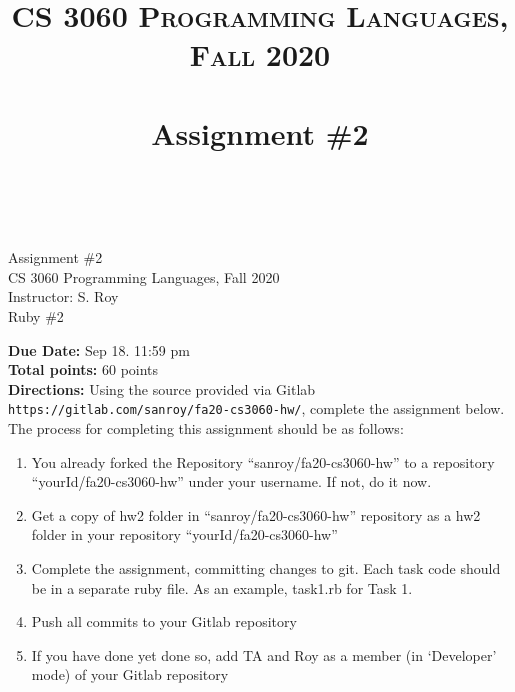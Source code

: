 \documentclass[paper=letter, fontsize=11pt]{scrartcl} %
\title{ 
    \normalfont \normalsize 
    \textsc{CS 3060 Programming Languages, Fall 2020} \\ [25pt] %
    \horrule{0.5pt} \\[0.4cm] %
    \huge Assignment \#2  \\ %
    \horrule{2pt} \\[0.5cm] %
}
\begin{document}
    \begin{center}
         Assignment \#2\\
        \small CS 3060 Programming Languages, Fall 2020 \\
        \small Instructor: S. Roy \\
        \huge Ruby \#2
    \end{center}
    
    \textbf{Due Date:}  Sep 18. 11:59 pm\\

    \textbf{Total points:} 60 points \\

    \textbf{Directions:} Using the source provided via Gitlab \@ \texttt{https://gitlab.com/sanroy/fa20-cs3060-hw/}, 
complete the assignment below. The process for completing this assignment should be as follows:

    \begin{enumerate}[noitemsep]
        \item You already forked the Repository ``sanroy/fa20-cs3060-hw'' to a repository ``yourId/fa20-cs3060-hw'' under your username. If not, do it now.
        \item Get a copy of hw2 folder in ``sanroy/fa20-cs3060-hw'' repository as a hw2 folder in your repository ``yourId/fa20-cs3060-hw'' 
        \item Complete the assignment, committing changes to git. Each task code should be in a separate ruby file. As an example, task1.rb for Task 1. 
        \item Push all commits to your Gitlab repository
        \item If you have done yet done so, add TA and Roy as a member (in `Developer' mode) of your Gitlab repository
    \end{enumerate}
\end{document}
